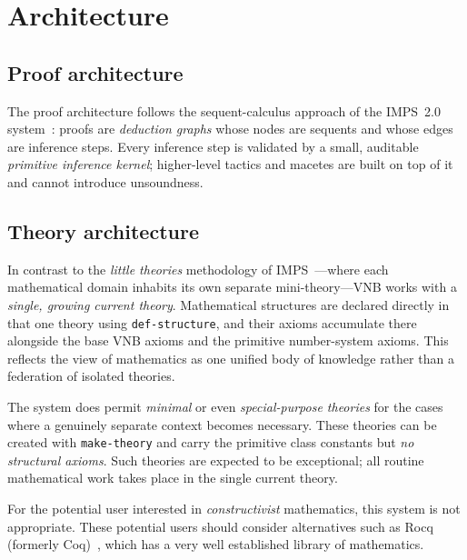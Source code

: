 \section{Architecture}
\label{sec:architecture}

\subsection{Proof architecture}

\begin{sloppypar}
The proof architecture follows the sequent-calculus approach of the
IMPS~2.0 system~\cite{IMPS}: proofs are \emph{deduction graphs} whose
nodes are sequents and whose edges are inference steps.  Every inference
step is validated by a small, auditable \emph{primitive inference kernel};
higher-level tactics and macetes are built on top of it and cannot
introduce unsoundness.
\end{sloppypar}

\subsection{Theory architecture}

In contrast to the \emph{little theories} methodology of
IMPS~\cite{IMPS}---where each mathematical domain inhabits its own
separate mini-theory---VNB works with a \emph{single, growing current
theory}.  Mathematical structures are declared directly in that one theory
using \texttt{def-structure}, and their axioms accumulate there alongside
the base VNB axioms and the primitive number-system axioms.  This reflects
the view of mathematics as one unified body of knowledge rather than a
federation of isolated theories.

The system does permit \emph{minimal} or even \emph{special-purpose theories}
for the cases where a genuinely separate context becomes necessary.
These theories can be created with \texttt{make-theory} and carry
the primitive class constants but \emph{no structural axioms}.  Such
theories are expected to be exceptional; all routine mathematical work
takes place in the single current theory.

\begin{remark}\label{remark:27137-61828-986360}
%
For the potential user interested in \emph{constructivist} mathematics,
this system is not appropriate. These potential users should consider
alternatives such as Rocq (formerly Coq)~\cite{Rocq}, which has a very well established library of
mathematics.
%
\end{remark}

